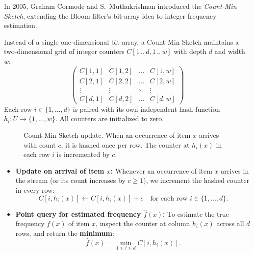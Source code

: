 In 2005, Graham Cormode and S.~Muthukrishnan introduced the \emph{Count-Min Sketch}, extending the Bloom filter's bit-array idea to integer frequency estimation.

Instead of a single one-dimensional bit array, a Count-Min Sketch maintains a two-dimensional grid of integer counters $C[1\,..\,d, 1\,..\,w]$ with depth $d$ and width $w$:
\[
  \begin{pmatrix}
    C[1, 1] & C[1, 2] & \dots & C[1, w] \\
    C[2, 1] & C[2, 2] & \dots & C[2, w] \\
    \vdots  & \vdots  & \ddots & \vdots  \\
    C[d, 1] & C[d, 2] & \dots & C[d, w]
  \end{pmatrix}
\]
Each row $i \in \{1, \dots, d\}$ is paired with its own independent hash function $h_i : U \to \{1, \dots, w\}$. All counters are initialized to zero.

\begin{figure}[h]
\centering
{}
\caption{Count-Min Sketch update. When an occurrence of item $x$ arrives with count $c$, it is hashed once per row. The counter at $h_i(x)$ in each row $i$ is incremented by $c$.}
\label{ch11:fig-count-min}
\end{figure}

\begin{itemize}
  \item \textbf{Update on arrival of item $x$:} Whenever an occurrence of item $x$ arrives in the stream (or its count increases by $c \ge 1$), we increment the hashed counter in every row:
  \[
    C[i, h_i(x)] \gets C[i, h_i(x)] + c \quad \text{for each row } i \in \{1, \dots, d\}.
  \]
  \item \textbf{Point query for estimated frequency $\hat{f}(x)$:} To estimate the true frequency $f(x)$ of item $x$, inspect the counter at column $h_i(x)$ across all $d$ rows, and return the \textbf{minimum}:
  \begin{equation}
    \label{ch11:eq-count-min}
    \hat{f}(x) = \min_{1 \le i \le d} C[i, h_i(x)].
  \end{equation}
\end{itemize}

